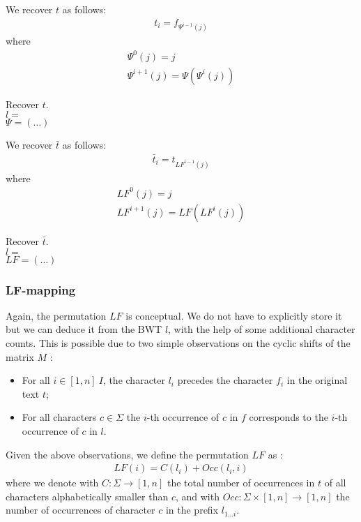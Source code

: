 We recover $t$ as follows:
\begin{eqnarray}
t_i = f_{\Psi^{i-1}(j)}
\end{eqnarray}
where 
\begin{eqnarray}
\Psi^0(j)=j\\
\Psi^{i+1}(j) = \Psi(\Psi^{i}(j))
\end{eqnarray}

\begin{example}
Recover $t$.\\
$l=$\\
$\Psi = (\dots)$
\end{example}

We recover $\bar{t}$ as follows:
\begin{eqnarray}
\bar{t}_i = t_{LF^{i-1}(j)}
\end{eqnarray}
where 
\begin{eqnarray}
LF^0(j)=j\\
LF^{i+1}(j) = LF(LF^{i}(j))
\end{eqnarray}

\begin{example}
Recover $\bar{t}$.\\
$l=$\\
$LF = (\dots)$
\end{example}

\subsubsection{LF-mapping}

Again, the permutation $LF$ is conceptual. We do not have to explicitly store it but we can deduce it from the BWT $l$, with the help of some additional character counts.
This is possible due to two simple observations on the cyclic shifts of the matrix $M$ \citep{Burrows1994}:
\begin{itemize}
\item For all $i \in [1,n] \ I$, the character $l_i$ precedes the character $f_i$ in the original text $t$;
\item For all characters $c \in \Sigma$ the $i$-th occurrence of $c$ in $f$ corresponds to the $i$-th occurrence of $c$ in $l$.
\end{itemize}
Given the above observations, we define the permutation $LF$ as \citep{Burrows1994,Ferragina2000}:
\begin{eqnarray}
LF(i) = C(l_i) + Occ(l_i, i)
\end{eqnarray}
where we denote with $C : \Sigma \rightarrow [1,n]$ the total number of occurrences in $t$ of all characters alphabetically smaller than $c$, and with $Occ :  \Sigma \times [1,n] \rightarrow [1,n]$ the number of occurrences of character $c$ in the prefix $l_{1 \dots i}$.

